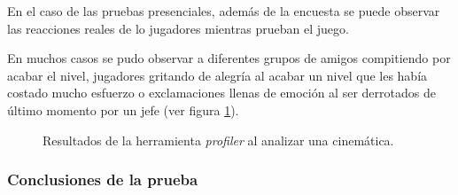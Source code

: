 En el caso de las pruebas presenciales, además de la encuesta se puede observar
las reacciones reales de lo jugadores mientras prueban el juego.

En muchos casos se pudo observar a diferentes grupos de amigos compitiendo por acabar el
nivel, jugadores gritando de alegría al acabar un nivel que les había costado
mucho esfuerzo o exclamaciones llenas de emoción al ser derrotados de último
momento por un jefe (ver figura \ref{fig:AlumnosESCOM}).
\begin{figure}
  \centering
 
        
  \caption{Resultados de la herramienta \textit{profiler} al analizar una cinemática.}
  \label{fig:AlumnosESCOM}
\end{figure}
\subsubsection{Conclusiones de la prueba}

